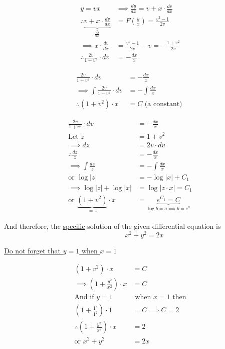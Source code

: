 \documentclass[14pt,fleqn]{extarticle}
\begin{document}
\begin{problem}
\begin{step}
	\begin{align}
y = vx &\implies \frac{dy}{dx} = v + x\cdot\frac{dv}{dx} \\
\therefore  \underbrace{v + x\cdot\frac{dv}{dx}}_{\frac{dy}{dx}} &= F\left(\frac{y}{x}\right) = \frac{v^2-1}{2v} \\
\implies x\cdot\frac{dv}{dx} &= \frac{v^2-1}{2v}- v = -\frac{1+v^2}{2v} \\
\therefore \frac{2v}{1+v^2}\cdot dv &= -\frac{dx}{x} 
\end{align} 
\end{step}
\begin{step}
	\begin{options}
		\correct
		
		\begin{align}
	\frac{2v}{1+v^2} \cdot dv &= -\frac{dx}{x} \\ 
	\implies \int \frac{2v}{1+v^2} \cdot dv &= -\int \frac{dx}{x} \\
	\therefore \left(1+v^2 \right)\cdot x &= C \text{ (a constant) }
\end{align}

	\end{options}
	\reason

	\begin{align}
\frac{2v}{1+v^2}\cdot dv &= -\frac{dx}{x} \\
\text{Let } z &= 1+v^2\\
\implies dz &= 2v\cdot dv \\
\therefore \frac{dz}{z} &= -\frac{dx}{x}\\
\implies \int\frac{dz}{z} &= -\int\frac{dx}{x} \\
\text{or } \log \vert z\vert &= -\log\vert x\vert + C_1 \\
\implies \log\vert z\vert + \log\vert x\vert &= \log\vert z\cdot x\vert = C_1 \\
\text{or } \underbrace{(1+v^2)}_{ = z}\cdot x &= \underbrace{e^{C_1} = C}_{\log b = a\implies b = e^a}
\end{align} 
\end{step}
\begin{step}
	\begin{options}
		\correct
		
		And therefore, the \underline{specific} solution of the given differential equation is  
		\[\qquad\qquad x^2 + y^2 = 2x \]

	\end{options}
	\reason

\underline{Do not forget that $y=1$ when $x=1$}

\begin{align}
(1+v^2)\cdot x &= C \\
\implies \left( 1 + \frac{y^2}{x^2}\right)\cdot x &= C\\
\text{And if }y = 1& \text{ when }x = 1 \text{ then}  \\
\left( 1 + \frac{1^2}{1^2}\right)\cdot 1 &= C \implies C = 2 \\
\therefore \left( 1 + \frac{y^2}{x^2}\right)\cdot x &= 2 \\
\text{or }x^2 + y^2 &= 2x 
\end{align} 
\end{step}
\end{problem}
\end{document}

